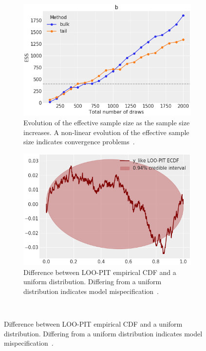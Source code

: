 \documentclass[anonymous=false, %
               format=acmsmall, %
               review=true, %
               screen=true, %
               nonacm=true]{acmart}
\begin{document}
\begin{figure}[!htb]
\centering
  \begin{subfigure}{.47\textwidth}
  \centering
    \includegraphics[width=\linewidth]{plot_ess.png}
    \caption{Evolution of the effective sample size as the sample size
    increases. A non-linear evolution of the effective sample size
    indicates convergence problems~\cite{vehtari2019rank}.}
  \end{subfigure}
  \begin{subfigure}{.47\textwidth}
  \centering
    \includegraphics[width=\linewidth]{plot_loo_pit.png}
    \caption{Difference between LOO-PIT empirical CDF and a uniform
      distribution. Differing
      from a uniform distribution indicates model
      mispecification~\cite{gabry2019visualization}.}\label{fig:loo_pit}
  \end{subfigure}\\

\end{figure}
\end{document}
